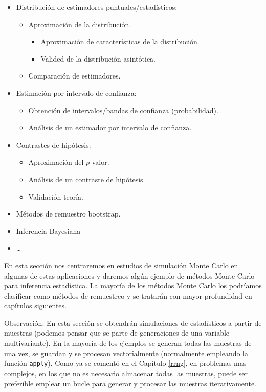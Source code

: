 \documentclass[
  10pt,
]{book}
\theoremstyle{break}
\theoremstyle{nonumberplain}
\begin{document}
\begin{itemize}
\item
  Distribución de estimadores puntuales/estadísticos:

  \begin{itemize}
  \item
    Aproximación de la distribución.

    \begin{itemize}
    \item
      Aproximación de características de la distribución.
    \item
      Valided de la distribución asintótica.
    \end{itemize}
  \item
    Comparación de estimadores.
  \end{itemize}
\item
  Estimación por intervalo de confianza:

  \begin{itemize}
  \item
    Obtención de intervalos/bandas de confianza (probabilidad).
  \item
    Análisis de un estimador por intervalo de confianza.
  \end{itemize}
\item
  Contrastes de hipótesis:

  \begin{itemize}
  \item
    Aproximación del \(p\)-valor.
  \item
    Análisis de un contraste de hipótesis.
  \item
    Validación teoría.
  \end{itemize}
\item
  Métodos de remuestro bootstrap.
\item
  Inferencia Bayesiana
\item
  \ldots{}
\end{itemize}

En esta sección nos centraremos en estudios de simulación Monte Carlo en algunas de estas aplicaciones y daremos algún ejemplo de métodos Monte Carlo para inferencia estadística.
La mayoría de los métodos Monte Carlo los podríamos clasificar como métodos de remuestreo y se tratarán con mayor profundidad en capítulos siguientes.

Observación:
En esta sección se obtendrán simulaciones de estadísticos a partir de muestras (podemos pensar que se parte de generaciones de una variable multivariante).
En la mayoría de los ejemplos se generan todas las muestras de una vez, se guardan y se procesan vectorialmente (normalmente empleando la función \texttt{apply}).
Como ya se comentó en el Capítulo \ref{rrng}, en problemas mas complejos, en los que no es necesario almacenar todas las muestras, puede ser preferible emplear un bucle para generar y procesar las muestras iterativamente.
\end{document}
